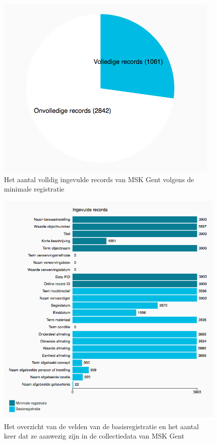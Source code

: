 \documentclass[fleqn,10pt]{voorstel}
\begin{document}
\begin{figure}[h]
	\caption{Het aantal volldig ingevulde records van MSK Gent volgens de minimale registratie}
	\centering
	\includegraphics[width=\linewidth]{pictures/VKC_aantal_minimale}
\end{figure}

\begin{figure}[h]
	\caption{Het overzicht van de velden van de basisregistratie en het aantal keer dat ze aanwezig zijn in de collectiedata van MSK Gent}
	\centering
	\includegraphics[width=\linewidth]{pictures/VKC_velden_basis}
\end{figure}
\end{document}
